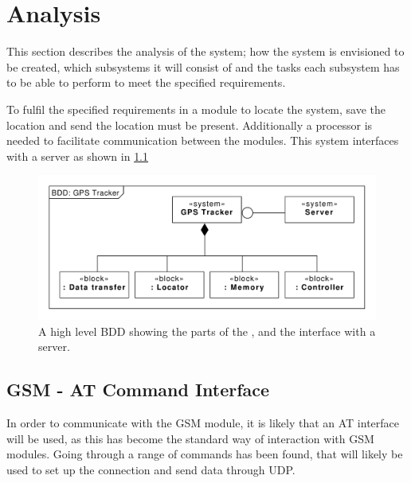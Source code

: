 
\chapter{Analysis}
This section describes the analysis of the system; how the system is envisioned to be created, which subsystems it will consist of and the tasks each subsystem has to be able to perform to meet the specified requirements.

To fulfil the specified requirements in  a module to locate the system, save the location and send the location must be present. Additionally a processor is needed to facilitate communication between the modules. This system interfaces with a server as shown in \cref{fig:BDD:unspecified}

\begin{figure}[H]
	\centering
	\includegraphics[width=0.7\linewidth]{gfx/Design/BDD_Unspecified.pdf}
	\caption{A high level BDD showing the parts of the \systemName, and the interface with a server.}
	\label{fig:BDD:unspecified}
\end{figure}

\section{GSM - AT Command Interface}
In order to communicate with the GSM module, it is likely that an AT interface will be used, as this has become the standard way of interaction with GSM modules.
Going through  a range of commands has been found, that will likely be used to set up the connection and send data through UDP.

